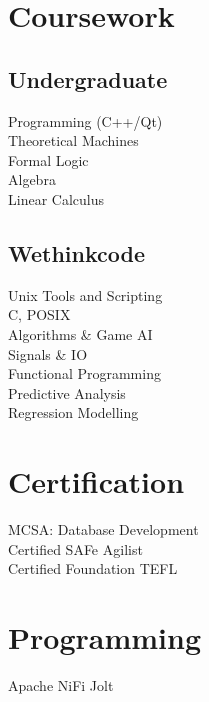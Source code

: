 \documentclass[]{deedy-resume-openfont}
\begin{document}
\begin{minipage}[t]{0.33\textwidth}

\section{Coursework}
\subsection{Undergraduate}
Programming (C++/Qt) \\
Theoretical Machines \\
Formal Logic \\
Algebra \\
Linear Calculus \\
\sectionsep

\subsection{Wethinkcode}
Unix Tools and Scripting \\
C, POSIX \\
Algorithms \& Game AI\\
Signals \& IO\\
Functional Programming \\
Predictive Analysis \\
Regression Modelling \\


\section{Certification}
MCSA: Database Development \\
Certified SAFe \textregistered Agilist \\
Certified Foundation TEFL
\sectionsep


\section{Programming}
\textbullet{} Apache NiFi \textbullet{} Jolt  \\


\end{minipage}
\end{document}

